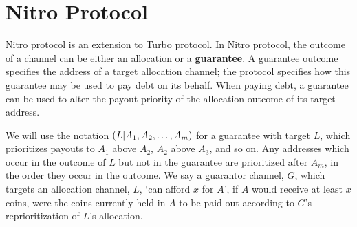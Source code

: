 \section{Nitro Protocol}

Nitro protocol is an extension to Turbo protocol.
In Nitro protocol, the outcome of a channel can be either an allocation or a \textbf{guarantee}.
A guarantee outcome specifies the address of a target allocation channel; the protocol specifies how this guarantee may be used to pay debt on its behalf.
When paying debt, a guarantee can be used to alter the payout priority of the allocation outcome of its target address. 



We will use the notation $( L | A_1, A_2, \dots, A_m )$ for a guarantee with target $L$, which prioritizes payouts to $A_1$ above $A_2$, $A_2$ above $A_3$, and so on.
Any addresses which occur in the outcome of $L$ but not in the guarantee are prioritized after $A_m$, in the order they occur in the outcome.
We say a guarantor channel, $G$, which targets an allocation channel, $L$, `can afford $x$ for $A$', if $A$ would receive at least $x$ coins, were the coins currently held in $A$ to be paid out according to $G$'s reprioritization of $L$'s allocation.

